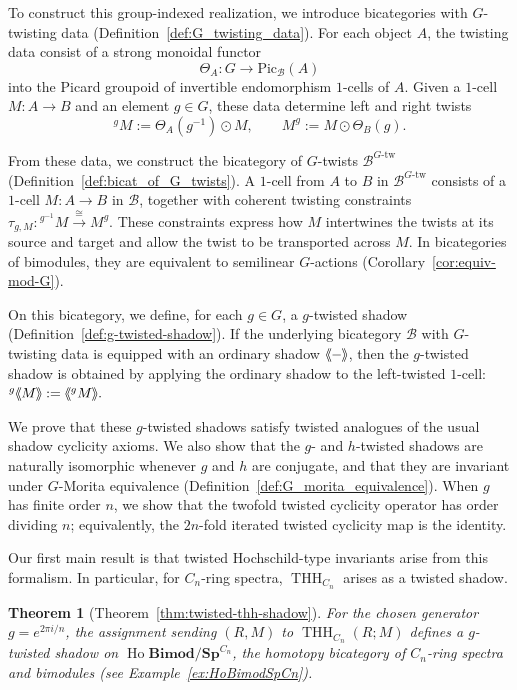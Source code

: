 \documentclass[11pt,oneside]{amsart}
\DeclareMathOperator{\Ho}{Ho}
\DeclareMathOperator{\THH}{THH}
\numberwithin{equation}{section}
\numberwithin{figure}{section}
\theoremstyle{plain}
\newtheorem{thm}{Theorem}[section]
\theoremstyle{definition}
\theoremstyle{remark}
\newcommand{\shspace}{\hspace{.5mm}} %
\newcommand{\sh}[1]{{\ensuremath{\shspace\hspace{1mm}\makebox[-1mm]{$\langle$}\makebox[0mm]{$\langle$}\hspace{1mm}{#1}\makebox[1mm]{$\rangle$}\makebox[0mm]{$\rangle$}\shspace}}}
\begin{document}
To construct this group-indexed realization, we introduce bicategories
with \(G\)-twisting data
(Definition~\ref{def:G_twisting_data}).
For each object \(A\), the twisting data consist of a strong monoidal
functor
\[
\Theta_A\colon G\longrightarrow \mathrm{Pic}_{\mathcal B}(A)
\]
into the Picard groupoid of invertible endomorphism \(1\)-cells of
\(A\). Given a \(1\)-cell \(M\colon A\to B\) and an element \(g\in G\),
these data determine left and right twists
\[
{}^gM:=\Theta_A(g^{-1})\odot M,
\qquad
M^g:=M\odot\Theta_B(g).
\]

From these data, we construct the bicategory of \(G\)-twists
\(\mathcal B^{G\text{-tw}}\)
(Definition~\ref{def:bicat_of_G_twists}). A \(1\)-cell from \(A\) to
\(B\) in \(\mathcal B^{G\text{-tw}}\) consists of a \(1\)-cell
\(M\colon A\to B\) in \(\mathcal B\), together with coherent twisting
constraints
\(
\tau_{g,M}\colon
{}^{g^{-1}}M
\xrightarrow{\cong}
M^g.
\)
These constraints express how \(M\) intertwines the twists at its
source and target and allow the twist to be transported across \(M\).
In bicategories of bimodules, they are equivalent to semilinear
\(G\)-actions (Corollary~\ref{cor:equiv-mod-G}).


On this bicategory, we define, for each \(g\in G\), a \(g\)-twisted shadow (Definition~\ref{def:g-twisted-shadow}). If the underlying bicategory \(\mathcal B\) with \(G\)-twisting data is equipped with an ordinary shadow \(\sh{-}\), then the \(g\)-twisted shadow is obtained by applying the ordinary shadow to the left-twisted \(1\)-cell:
\(
{}^g\sh{M}:=\sh{{}^gM}.
\)

We prove that these \(g\)-twisted shadows satisfy twisted analogues of the usual shadow cyclicity axioms. We also show that the \(g\)- and \(h\)-twisted shadows are naturally isomorphic whenever \(g\) and \(h\) are conjugate, and that they are invariant under \(G\)-Morita equivalence (Definition~\ref{def:G_morita_equivalence}). When \(g\) has finite order \(n\), we show that the twofold twisted
cyclicity operator has order dividing \(n\); equivalently, the
\(2n\)-fold iterated twisted cyclicity map is the identity.

 

 

Our first main result is that twisted Hochschild-type invariants arise from this formalism. In particular, for \(C_n\)-ring spectra, \(\THH_{C_n}\) arises as a twisted shadow.

\begin{thm}[Theorem~\ref{thm:twisted-thh-shadow}]
For the chosen generator \(g=e^{2\pi i/n}\), the assignment sending
\((R,M)\) to \(\THH_{C_n}(R;M)\)
defines a \(g\)-twisted shadow on
\(\Ho\mathbf{Bimod}/\mathbf{Sp}^{C_n}\),
the homotopy bicategory of \(C_n\)-ring spectra and bimodules
(see Example~\ref{ex:HoBimodSpCn}).
\end{thm}
\end{document}
